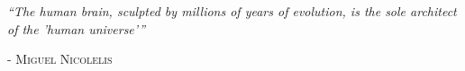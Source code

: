 \documentclass[a4paper, 12pt, spanish, twoside]{article}
\begin{document}

\afterpage{\blankpage} %
\newpage
\thispagestyle{plain}






\newpage
\thispagestyle{empty}

\begin{flushright} %
    \vspace*{5cm} %

    \textit{“The human brain, sculpted by millions of years of evolution, is the sole architect of the 'human universe'”}

    \medskip %
    - \textsc{Miguel Nicolelis}

\end{flushright}


\afterpage{\blankpage} %












\newpage
{}
\end{document}
